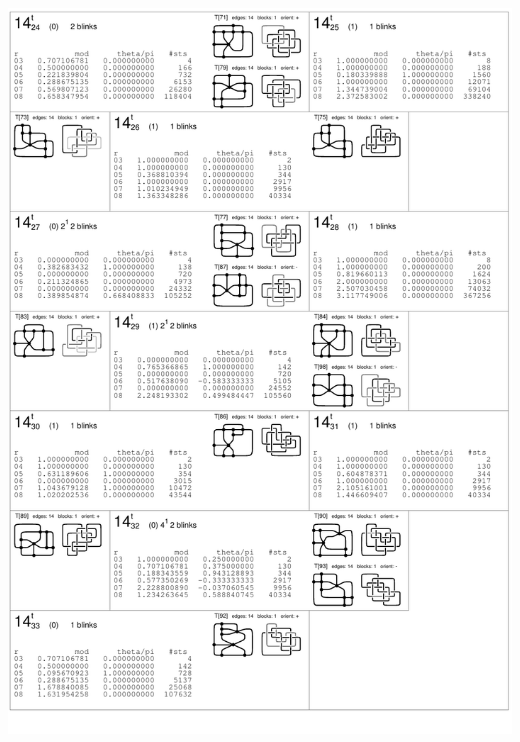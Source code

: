 \begin{center}
 \includegraphics[height=23.5cm]{E.figsbw2/con3catalog006_bw.pdf} \eject

\end{center}
